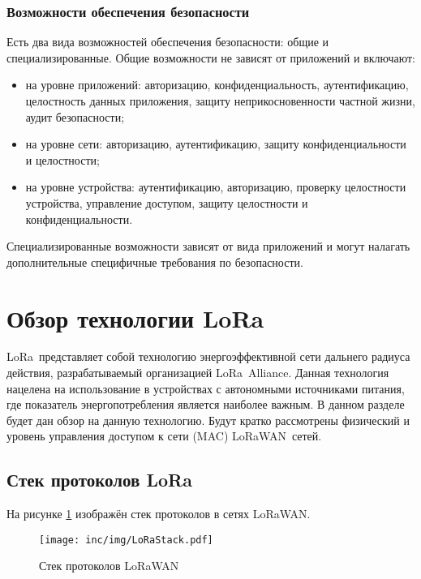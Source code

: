 \subsubsection{Возможности обеспечения безопасности}

Есть два вида возможностей обеспечения безопасности: общие и специализированные.
Общие возможности не зависят от приложений и включают:
\begin{itemize}
	\item на уровне приложений: авторизацию, конфиденциальность, 
аутентификацию, целостность данных приложения, защиту неприкосновенности частной 
жизни, аудит безопасности;
	\item на уровне сети: авторизацию, аутентификацию, защиту 
конфиденциальности и целостности;
	\item на уровне устройства: аутентификацию, авторизацию, проверку 
целостности устройства, управление доступом, защиту целостности и 
конфиденциальности.
\end{itemize}

Специализированные возможности зависят от вида приложений и могут налагать 
дополнительные специфичные требования по безопасности.

\newpage
\section{Обзор технологии LoRa\texttrademark} 

LoRa\texttrademark~представляет собой технологию энергоэффективной сети 
дальнего радиуса действия, разрабатываемый организацией 
LoRa\texttrademark~Alliance.
Данная технология нацелена на использование в устройствах с автономными 
источниками питания, где показатель энергопотребления является наиболее важным.
В данном разделе будет дан обзор на данную технологию.
Будут кратко рассмотрены физический и уровень управления доступом к сети (MAC) 
LoRaWAN\texttrademark~сетей.

\subsection{Стек протоколов LoRa\texttrademark}

На рисунке \ref{fig:lorastack} изображён стек протоколов в сетях 
LoRaWAN\texttrademark. 

\begin{figure}[!h]
  \centering
  \texttt{[image: inc/img/LoRaStack.pdf]}
	\caption{Стек протоколов LoRaWAN\texttrademark}
  \label{fig:lorastack}
\end{figure}

